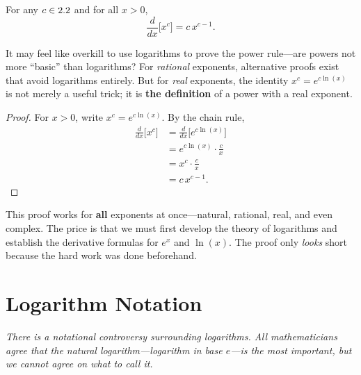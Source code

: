 \begin{theorem}
\label{thm:4-7}
For any $c \in 2.2$ and for all $x > 0$,
\[
  \frac{d}{dx}\bigl[x^{c}\bigr] = c\, x^{c-1}.
\]
\end{theorem}

\begin{remark}
It may feel like overkill to use logarithms to prove the power rule---are powers not more ``basic'' than logarithms?  For \emph{rational} exponents, alternative proofs exist that avoid logarithms entirely.  But for \emph{real} exponents, the identity $x^{c} = e^{c \ln(x)}$ is not merely a useful trick; it is \textbf{the definition} of a power with a real exponent.
\end{remark}

\begin{proof}
For $x > 0$, write $x^{c} = e^{c \ln(x)}$.  By the chain rule,
\begin{align*}
  \frac{d}{dx}\bigl[x^{c}\bigr]
  &= \frac{d}{dx}\bigl[e^{c \ln(x)}\bigr] \\
  &= e^{c \ln(x)} \cdot \frac{c}{x} \\
  &= x^{c} \cdot \frac{c}{x} \\
  &= c\, x^{c-1}.
\end{align*}
\end{proof}

\begin{remark}
This proof works for \textbf{all} exponents at once---natural, rational, real, and even complex.  The price is that we must first develop the theory of logarithms and establish the derivative formulas for $e^{x}$ and $\ln(x)$.  The proof only \textit{looks} short because the hard work was done beforehand.
\end{remark}

\section{Logarithm Notation}
\label{sec:4.11}

\textit{There is a notational controversy surrounding logarithms.  All mathematicians agree that the natural logarithm---logarithm in base $e$---is the most important, but we cannot agree on what to call it.}

